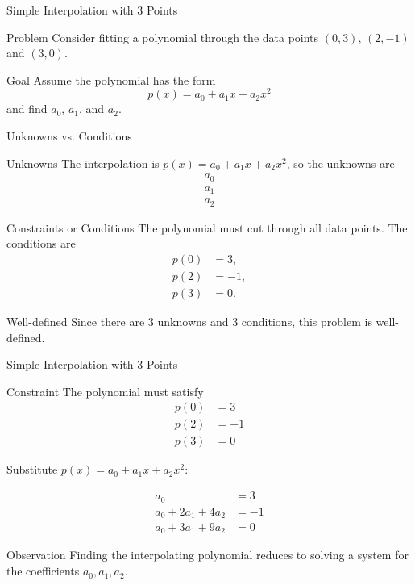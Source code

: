 \documentclass[10pt]{beamer}
\begin{document}
\begin{frame}{Simple Interpolation with 3 Points}

\begin{block}{Problem}
    Consider fitting a polynomial through the data points $(0,3)$, $(2,-1)$ and $(3,0)$.
\end{block}

\begin{block}{Goal}
Assume the polynomial has the form 
    $$
    p(x) = a_0 + a_1x + a_2x^2
    $$
    and find $a_0$, $a_1$, and $a_2$.
\end{block}

\end{frame}
\begin{frame}{Unknowns vs. Conditions}

    \begin{block}{Unknowns}
The interpolation is $p(x) = a_0 + a_1x + a_2x^2$, so the unknowns are
\begin{align*}
    a_0\\
    a_1\\
    a_2
\end{align*}
\end{block}



    \begin{block}{Constraints or Conditions}
The polynomial must cut through all data points. The conditions are
\begin{align*}
    p(0)&=3,\\
    p(2)&=-1,\\
    p(3)&=0.
\end{align*}
\end{block}

\begin{block}{Well-defined}
Since there are 3 unknowns and 3 conditions, this problem is well-defined. 
\end{block}

\end{frame}
\begin{frame}{Simple Interpolation with 3 Points}

\begin{block}{Constraint}
The polynomial must satisfy
\begin{align*}
p(0) &= 3 \\
p(2) &= -1 \\
p(3) &= 0
\end{align*}
\end{block}

Substitute \(p(x)=a_0+a_1x+a_2x^2\):

\[
\begin{aligned}
a_0 &= 3 \\
a_0 + 2a_1 + 4a_2 &= -1 \\
a_0 + 3a_1 + 9a_2 &= 0
\end{aligned}
\]

\begin{block}{Observation}
Finding the interpolating polynomial reduces to solving a system
for the coefficients \(a_0,a_1,a_2\).
\end{block}
\end{frame}
\end{document}
